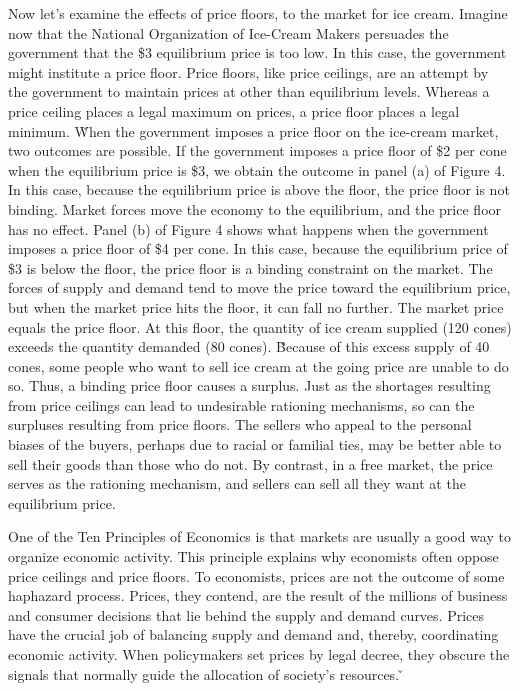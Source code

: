 Now let's examine the effects of price floors, to the market for ice cream. Imagine now that the National
Organization of Ice-Cream Makers persuades the government that the \$3 equilibrium price is too low. In this case,
the government might institute a price floor. Price floors, like price ceilings, are an attempt by the government to
maintain prices at other than equilibrium levels. Whereas a price ceiling places a legal maximum on prices, a price
floor places a legal minimum. \v

When the government imposes a price floor on the ice-cream market, two outcomes are possible. If the government
imposes a price floor of \$2 per cone when the equilibrium price is \$3, we obtain the outcome in panel (a) of Figure
4. In this case, because the equilibrium price is above the floor, the price floor is not binding. Market forces
move the economy to the equilibrium, and the price floor has no effect. Panel (b) of Figure 4 shows what happens when
the government imposes a price floor of \$4 per cone. In this case, because the equilibrium price of \$3 is below the
floor, the price floor is a binding constraint on the market. The forces of supply and demand tend to move the price
toward the equilibrium price, but when the market price hits the floor, it can fall no further. The market price
equals the price floor. At this floor, the quantity of ice cream supplied (120 cones) exceeds the quantity demanded
(80 cones). \v

Because of this excess supply of 40 cones, some people who want to sell ice cream at the going price are unable to do
so. Thus, a binding price floor causes a surplus. Just as the shortages resulting from price ceilings can lead to
undesirable rationing mechanisms, so can the surpluses resulting from price floors. The sellers who appeal to the
personal biases of the buyers, perhaps due to racial or familial ties, may be better able to sell their goods than
those who do not. By contrast, in a free market, the price serves as the rationing mechanism, and sellers can sell
all they want at the equilibrium price.


One of the Ten Principles of Economics is that markets are usually a good way to organize economic activity. This
principle explains why economists often oppose price ceilings and price floors. To economists, prices are not the
outcome of some haphazard process. Prices, they contend, are the result of the millions of business and consumer
decisions that lie behind the supply and demand curves. Prices have the crucial job of balancing supply and demand
and, thereby, coordinating economic activity. When policymakers set prices by legal decree, they obscure the signals
that normally guide the allocation of society's resources. \v

